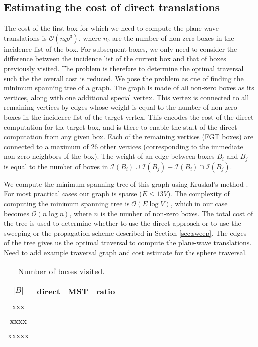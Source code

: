 \subsection{Estimating the cost of direct translations}
\label{sec:mst}
The cost of the first box for which we need to compute the plane-wave translations is $\mathcal{O}(n_bp^3)$, where $n_b$ are the number of non-zero boxes in the incidence list of the box. For subsequent boxes, we only need to consider the difference between the incidence list of the current box and that of boxes previously visited. The problem is therefore to determine the optimal traversal such the the overall cost is reduced. We pose the problem as one of finding the minimum spanning tree of a graph. The graph is made of all non-zero boxes as its vertices, along with one additional special vertex. This vertex is connected to all remaining vertices by edges whose weight is equal to the number of non-zero boxes in the incidence list of the target vertex. This encodes the cost of the direct computation for the target box, and is there to enable the start of the direct computation from any given box. Each of the remaining vertices (FGT boxes) are connected to a maximum of $26$ other vertices (corresponding to the immediate non-zero neighbors of the box). The weight of an edge between boxes $B_i$ and $B_j$ is equal to the number of boxes in $\mathcal{I}(B_i)\cup\mathcal{I}(B_j) - \mathcal{I}(B_i)\cap\mathcal{I}(B_j)$.    

We compute the minimum spanning tree of this graph using Kruskal's method \cite{kruskal56}. For most practical cases our graph is sparse ($E\le13V$). The complexity of computing the minimum spanning tree is $\mathcal{O}(E\log V)$, which in our case becomes $\mathcal{O}(n\log n)$, where $n$ is the number of non-zero boxes. The total cost of the tree is used to determine whether to use the direct approach or to use the sweeping or the propagation scheme described in Section \ref{sec:sweep}. The edges of the tree gives us the optimal traversal to compute the plane-wave translations. \ul{Need to add example traversal graph and cost estimate for the sphere traversal.}

\begin{table*}[bht]
\centering
\begin{tabular}{cccc}\hline
         $|B|$  &  direct & MST & ratio \\ \hline
         xxx & & &  \\  
        xxxx & & &  \\  
       xxxxx & & &  \\  
\hline
\end{tabular}
\caption{Number of boxes visited.\label{count}}
\end{table*}
